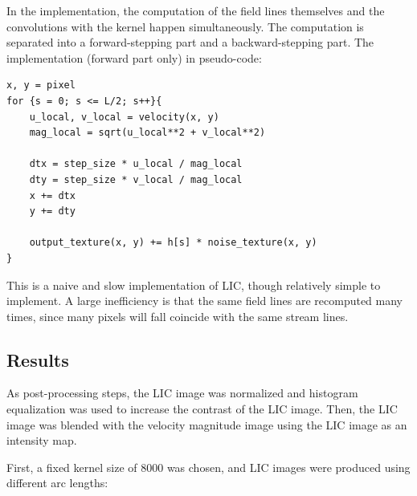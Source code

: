 \documentclass{article}
\begin{document}
In the implementation, the computation of the field lines themselves and the convolutions with the kernel happen simultaneously.
The computation is separated into a forward-stepping part and a backward-stepping part.
The implementation (forward part only) in pseudo-code:
\begin{verbatim}
x, y = pixel
for {s = 0; s <= L/2; s++}{
    u_local, v_local = velocity(x, y)
    mag_local = sqrt(u_local**2 + v_local**2) 

    dtx = step_size * u_local / mag_local
    dty = step_size * v_local / mag_local
    x += dtx
    y += dty

    output_texture(x, y) += h[s] * noise_texture(x, y)
}

\end{verbatim}
This is a naive and slow implementation of LIC, though relatively simple to implement.
A large inefficiency is that the same field lines are recomputed many times, since many pixels will 
fall coincide with the same stream lines.

\subsection{Results}
As post-processing steps, the LIC image was normalized and histogram equalization was used to increase
the contrast of the LIC image. Then, the LIC image was blended with the velocity magnitude image using the 
LIC image as an intensity map.

First, a fixed kernel size of 8000 was chosen, and LIC images
were produced using different arc lengths:
\end{document}
